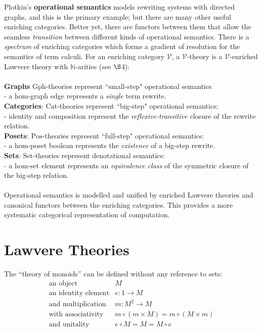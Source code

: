 \documentclass[a4paper,UKenglish]{article}
\theoremstyle{definition}
\newcommand{\Gph}{\mathrm{Gph}}
\newcommand{\Set}{\mathrm{Set}}
\newcommand{\Cat}{\mathrm{Cat}}
\newcommand{\Pos}{\mathrm{Pos}}
\newcommand{\NN}{\mathbb{N}}
\newcommand{\V}{\mathscr{V}}
\begin{document}
Plotkin's \textbf{operational semantics} \cite{sos} models rewriting systems with directed graphs, and this is the primary example; but there are many other useful enriching categories. Better yet, there are functors between them that allow the seamless \textit{transition} between different kinds of operational semantics. There is a \textit{spectrum} of enriching categories which forms a gradient of resolution for the semantics of term calculi. For an enriching category $\V$, a $\V$-theory is a $\V$-enriched Lawvere theory with $\NN$-arities (see $\S$4):\\\\
\textbf{Graphs} $\Gph$-theories represent ``small-step" operational semantics\\ - a hom-graph edge represents a \textit{single} term rewrite.\\
\textbf{Categories}: $\Cat$-theories represent ``big-step" operational semantics:\\ - identity and composition represent the \textit{reflexive-transitive} closure of the rewrite relation.\\
\textbf{Posets}: $\Pos$-theories represent ``full-step" operational semantics:\\ - a hom-poset boolean represents the \textit{existence} of a big-step rewrite.\\
\textbf{Sets}: $\Set$-theories represent denotational semantics:\\ - a hom-set element represents an \textit{equivalence class} of the symmetric closure of the big-step relation.\\\\
Operational semantics is modelled and unified by enriched Lawvere theories and canonical functors between the enriching categories. This provides a more systematic categorical representation of computation.

\section{Lawvere Theories}
The ``theory of monoids'' can be defined without any reference to sets:
\[\begin{array}{rl}
\text{an object} & M\\
\text{an identity element} & e:1 \to M\\
\text{and multiplication} & m: M^2 \to M\\
\text{with associativity} & m \circ (m \times M) = m \circ (M \times m)\\
\text{and unitality} & e \circ M = M = M \circ e\\
\end{array}\]
\end{document}
